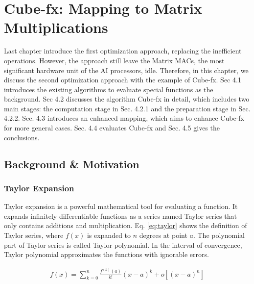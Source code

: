 \chapter{Cube-fx: Mapping to Matrix Multiplications}
\label{sec_4}

Last chapter introduce the first optimization approach, replacing the
inefficient operations. However, the approach still leave the Matrix MACs, the most significant hardware unit of the AI processors, idle. Therefore, in this chapter, we discuss the second optimization approach with the example of Cube-fx. Sec 4.1 introduces the existing algorithms to evaluate special functions as the background. Sec 4.2 discusses the algorithm Cube-fx in detail, which includes two main stages: the computation stage in Sec. 4.2.1 and the preparation stage in Sec. 4.2.2. Sec. 4.3 introduces an enhanced mapping, which aims to enhance Cube-fx for more general cases. Sec. 4.4 evaluates Cube-fx and Sec. 4.5 gives the conclusions.

\section{Background \& Motivation}

\subsection{Taylor Expansion \label{sec:2.3}}

Taylor expansion is a powerful mathematical tool for evaluating a function. It expands infinitely differentiable functions as a series named Taylor series that only contains additions and multiplication. Eq. \ref{eq:taylor} shows the definition of Taylor series, where $f(x)$ is expanded to $n$ degrees at point $a$. The polynomial part of Taylor series is called Taylor polynomial. In the interval of convergence, Taylor polynomial approximates the functions with ignorable errors.

\begin{equation}
    \label{eq:taylor}
    \begin{aligned}
    f(x) = \sum_{k = 0}^{n}\frac{f^{(k)}(a)}{k!}(x - a)^k + o[(x - a) ^ n]
    \end{aligned}
    \end{equation}

